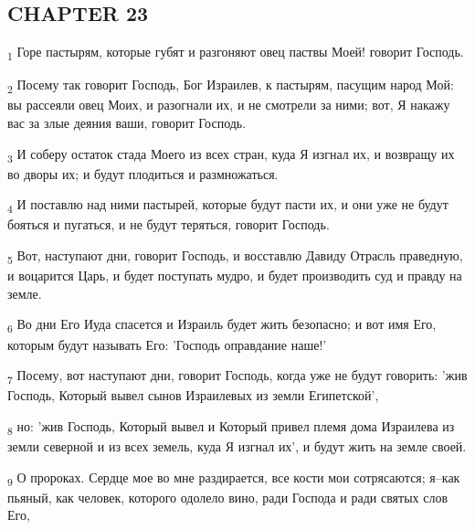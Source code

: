 \subsection{CHAPTER 23}
\begin{tcolorbox}
\textsubscript{1} Горе пастырям, которые губят и разгоняют овец паствы Моей! говорит Господь.
\end{tcolorbox}
\begin{tcolorbox}
\textsubscript{2} Посему так говорит Господь, Бог Израилев, к пастырям, пасущим народ Мой: вы рассеяли овец Моих, и разогнали их, и не смотрели за ними; вот, Я накажу вас за злые деяния ваши, говорит Господь.
\end{tcolorbox}
\begin{tcolorbox}
\textsubscript{3} И соберу остаток стада Моего из всех стран, куда Я изгнал их, и возвращу их во дворы их; и будут плодиться и размножаться.
\end{tcolorbox}
\begin{tcolorbox}
\textsubscript{4} И поставлю над ними пастырей, которые будут пасти их, и они уже не будут бояться и пугаться, и не будут теряться, говорит Господь.
\end{tcolorbox}
\begin{tcolorbox}
\textsubscript{5} Вот, наступают дни, говорит Господь, и восставлю Давиду Отрасль праведную, и воцарится Царь, и будет поступать мудро, и будет производить суд и правду на земле.
\end{tcolorbox}
\begin{tcolorbox}
\textsubscript{6} Во дни Его Иуда спасется и Израиль будет жить безопасно; и вот имя Его, которым будут называть Его: 'Господь оправдание наше!'
\end{tcolorbox}
\begin{tcolorbox}
\textsubscript{7} Посему, вот наступают дни, говорит Господь, когда уже не будут говорить: 'жив Господь, Который вывел сынов Израилевых из земли Египетской',
\end{tcolorbox}
\begin{tcolorbox}
\textsubscript{8} но: 'жив Господь, Который вывел и Который привел племя дома Израилева из земли северной и из всех земель, куда Я изгнал их', и будут жить на земле своей.
\end{tcolorbox}
\begin{tcolorbox}
\textsubscript{9} О пророках. Сердце мое во мне раздирается, все кости мои сотрясаются; я--как пьяный, как человек, которого одолело вино, ради Господа и ради святых слов Его,
\end{tcolorbox}
